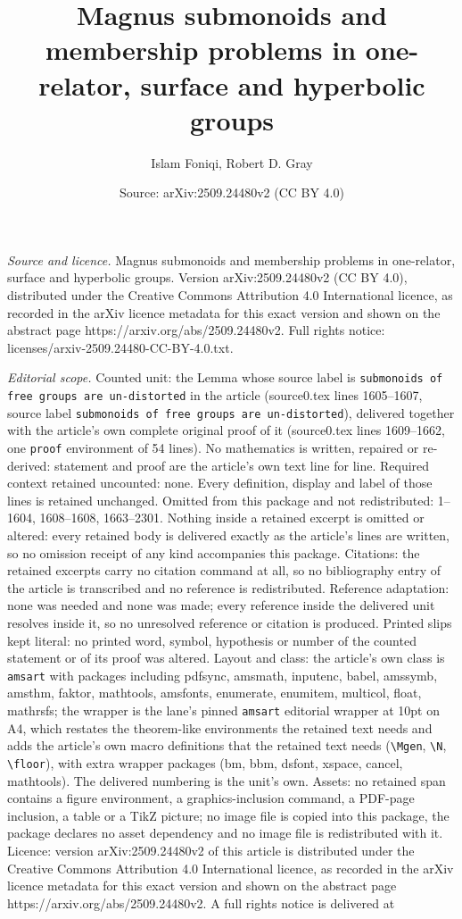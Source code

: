 \documentclass[10pt,a4paper]{amsart}
\title[Magnus submonoids and membership problems in one-relator, su]{Magnus submonoids and membership problems in one-relator, surface and hyperbolic groups}
\author{Islam Foniqi, Robert D. Gray}
\date{Source: arXiv:2509.24480v2 (CC BY 4.0)}
\begin{document}
\maketitle

\noindent\emph{Source and licence.} Magnus submonoids and membership problems in one-relator, surface and hyperbolic groups. Version arXiv:2509.24480v2 (CC BY 4.0), distributed under the Creative Commons Attribution 4.0 International licence, as recorded in the arXiv licence metadata for this exact version and shown on the abstract page https://arxiv.org/abs/2509.24480v2. Full rights notice: licenses/arxiv-2509.24480-CC-BY-4.0.txt.\par\smallskip

\noindent\textit{Editorial scope.} Counted unit: the Lemma whose source label is \texttt{submonoids of free groups are un-distorted} in the article (source0.tex lines 1605--1607, source label \texttt{submonoids of free groups are un-distorted}), delivered together with the article's own complete original proof of it (source0.tex lines 1609--1662, one \texttt{proof} environment of 54 lines). No mathematics is written, repaired or re-derived: statement and proof are the article's own text line for line. Required context retained uncounted: none. Every definition, display and label of those lines is retained unchanged. Omitted from this package and not redistributed: 1--1604, 1608--1608, 1663--2301. Nothing inside a retained excerpt is omitted or altered: every retained body is delivered exactly as the article's lines are written, so no omission receipt of any kind accompanies this package. Citations: the retained excerpts carry no citation command at all, so no bibliography entry of the article is transcribed and no reference is redistributed. Reference adaptation: none was needed and none was made; every reference inside the delivered unit resolves inside it, so no unresolved reference or citation is produced. Printed slips kept literal: no printed word, symbol, hypothesis or number of the counted statement or of its proof was altered. Layout and class: the article's own class is \texttt{amsart} with packages including pdfsync, amsmath, inputenc, babel, amssymb, amsthm, faktor, mathtools, amsfonts, enumerate, enumitem, multicol, float, mathrsfs; the wrapper is the lane's pinned \texttt{amsart} editorial wrapper at 10pt on A4, which restates the theorem-like environments the retained text needs and adds the article's own macro definitions that the retained text needs (\texttt{\textbackslash Mgen}, \texttt{\textbackslash N}, \texttt{\textbackslash floor}), with extra wrapper packages (bm, bbm, dsfont, xspace, cancel, mathtools). The delivered numbering is the unit's own. Assets: no retained span contains a figure environment, a graphics-inclusion command, a PDF-page inclusion, a table or a TikZ picture; no image file is copied into this package, the package declares no asset dependency and no image file is redistributed with it. Licence: version arXiv:2509.24480v2 of this article is distributed under the Creative Commons Attribution 4.0 International licence, as recorded in the arXiv licence metadata for this exact version and shown on the abstract page https://arxiv.org/abs/2509.24480v2. A full rights notice is delivered at 
\end{document}

